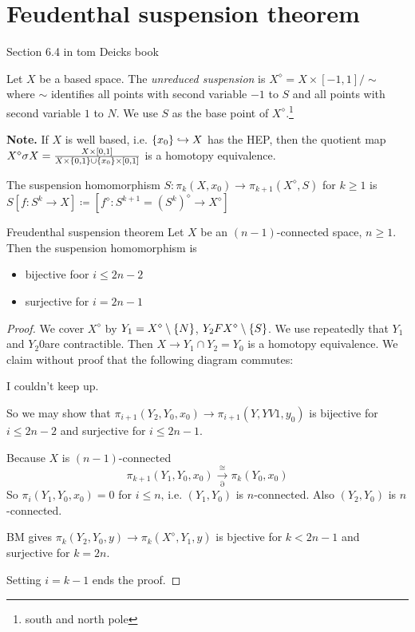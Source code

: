 \documentclass[language=english]{TemplateLecture}
\begin{document}
\section{Feudenthal suspension theorem}
Section 6.4 in tom Deicks book

\begin{defi}{}{}
    Let \(X\) be a based space. The \emph{unreduced suspension} is \(X^\diamond = X\times [-1,1]/\sim\) where \(\sim\) identifies all points with second variable \(-1\) to \(S\) and all points with second variable \(1\) to \(N\). We use \(S\) as the base point of \(X^\diamond\).\footnote{south and north pole}
\end{defi}

\textbf{Note.} If \(X\) is well based, i.e. \(\{x_0\} \hookrightarrow X\) has the HEP, then the quotient map \(X^\diamond \sigma X = \frac{X\times [0,1]}{X\times \{0,1\}\cup \{x_0\}\times [0,1]}\) is a homotopy equivalence.

The suspension homomorphism \(S\colon \pi_k(X,x_0) \to \pi_{k+1}(X^\diamond, S)\) for \(k \geq 1\) is \(S[f\colon S^k \to X] \coloneq [f^\diamond \colon S^{k+1}= (S^k)^\diamond \to X^\diamond]\)

\begin{thm}{Freudenthal suspension theorem}{}
    Let \(X\) be an \((n-1)\)-connected space, \(n \geq 1\). Then the suspension homomorphism is \begin{itemize}
        \item bijective foor \(i\leq 2n-2\)
        \item surjective for \(i = 2n-1\)
    \end{itemize}
\end{thm}

\begin{proof}
    We cover \(X^\diamond\) by \(Y_1 = X^\diamond \setminus \{N\}\), \(Y_2 F X^\diamond \setminus \{S\}\). We use repeatedly that \(Y_1\) and \(Y_2\)0are contractible. Then \(X\to Y_1\cap Y_2 = Y_0\) is a homotopy equivalence. We claim without proof that the following diagram commutes:

    I couldn't keep up.

    So we may show that \(\pi_{i+1} (Y_2, Y_0, x_0)\to \pi_{i+1}(Y, YV1, y_0)\) is bijective for \(i \leq 2n-2\) and surjective for \(i \leq 2n-1\).

    Because \(X\) is \((n-1)\)-connected
    \[\pi_{k+1}(Y_1, Y_0, x_0) \xrightarrow[\partial]{\cong} \pi_k(Y_0, x_0)\]
    So \(\pi_i(Y_1, Y_0, x_0) = 0\) for \(i \leq n\), i.e. \((Y_1, Y_0)\) is \(n\)-connected. Also \((Y_2, Y_0)\) is \(n\)-connected.

    BM gives \(\pi_k(Y_2, Y_0, y) \to \pi_k(X^\diamond, Y_1, y)\) is bjective for \(k < 2n-1\) and surjective for \(k = 2n\).

    Setting \(i = k-1\) ends the proof.
\end{proof}
\end{document}
